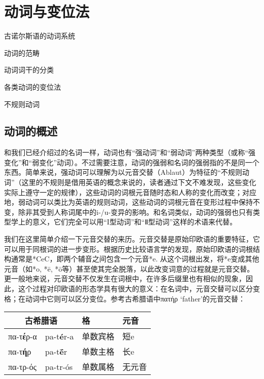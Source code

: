 \chapter{动词与变位法}

\begin{introduction}[章节要点]
    \item 古诺尔斯语的动词系统
    \item 动词的范畴
    \item 动词词干的分类
    \item 各类动词的变位法
    \item 不规则动词
\end{introduction}

\section{动词的概述}\label{sec:verb-intro}
和我们已经介绍过的名词一样，动词也有“强动词”和“弱动词”两种类型（或称“强变化”和“弱变化”动词）。不过需要注意，动词的强弱和名词的强弱指的不是同一个东西。简单来说，强动词可以理解为以元音交替（Ablaut）为特征的“不规则动词”（这里的不规则是借用英语的概念来说的，读者通过下文不难发现，这些变化实际上遵守一定的规律），这些动词的词根元音随时态和人称的变化而改变；对应地，弱动词可以类比为英语的规则动词，这些动词的词根元音在变形过程中保持不变，除非其受到人称词尾中的i-/u-变异的影响。和名词类似，动词的强弱也只有类型学上的意义，它们完全可以用“I型动词”和“Ⅱ型动词”这样的术语来代替。

我们在这里简单介绍一下元音交替的来历。元音交替是原始印欧语的重要特征，它可以用于同根词的进一步变形。根据历史比较语言学的发现，原始印欧语的词根结构通常是*CeC，即两个辅音之间包含一个元音*e. 从这个词根出发，将*e变成其他元音（如*o, *ē, *ō等）甚至使其完全脱落，以此改变词意的过程就是元音交替。更一般地来说，元音交替不仅发生在词根中，在许多后缀里也有相似的现象，因此，这个过程对印欧语的形态学具有很大的意义：在名词中，元音交替可以区分变格；在动词中它则可以区分变位。参考古希腊语中πατήρ `father'的元音交替：

\begin{longtable}{llll}
    \toprule
    \multicolumn{2}{c}{古希腊语} & 格                 & 元音         \\
    \midrule
    \endhead
    \bottomrule
    \endfoot
    πα-τ\textbf{έ}ρ-α        & pa-t\textbf{é}r-a & 单数宾格 & 短e  \\
    πα-τ\textbf{ή}ρ          & pa-t\textbf{ḗ}r   & 单数主格 & 长e  \\
    πα-τρ-ός                 & pa-tr-ós          & 单数属格 & 无元音 \\
\end{longtable}

